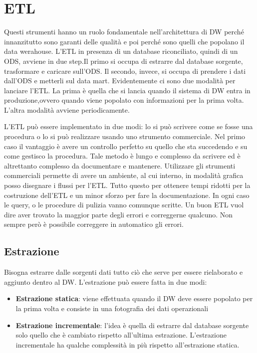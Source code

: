 \section{ETL}

Questi strumenti hanno un ruolo fondamentale nell’architettura di DW perché innanzitutto sono garanti delle qualità e poi perché sono quelli che popolano il data werahouse. L’ETL in presenza di un database riconciliato, quindi di un ODS, avviene in due step.Il primo si occupa di estrarre dal database sorgente, trasformare e caricare sull’ODS. Il secondo, invece, si occupa di prendere i dati dall’ODS e metterli sul data mart. Evidentemente ci sono due modalità per lanciare l’ETL. La prima è quella che si lancia quando il sistema di DW entra in produzione,ovvero quando viene popolato con informazioni per la prima volta. L’altra modalità avviene periodicamente. 

L’ETL può essere implementato in due modi: lo si può scrivere come se fosse una procedura o lo si può realizzare usando uno strumento commerciale. Nel primo caso il vantaggio è avere un controllo perfetto su quello che sta succedendo e su come gestisco la procedura. Tale metodo è lungo e complesso da scrivere ed è altrettanto complesso da documentare e mantenere. Utilizzare gli strumenti commerciali permette di avere un ambiente, al cui interno, in modalità grafica posso disegnare i flussi per l’ETL. Tutto questo per ottenere tempi ridotti per la costruzione dell’ETL e un minor sforzo per fare la documentazione. In ogni caso le query, o le procedure di pulizia vanno comunque scritte. Un buon ETL vuol dire aver trovato la maggior parte degli errori e correggerne qualcuno. Non sempre però è possibile correggere in automatico gli errori. 
\subsection{Estrazione}
Bisogna estrarre dalle sorgenti dati tutto ciò che serve per essere rielaborato e aggiunto dentro al DW. L’estrazione può essere fatta in due modi:
\begin{itemize}
	\item 
	\textbf{Estrazione statica}: viene effettuata quando il DW deve essere popolato per la prima volta e consiste in una fotografia dei dati operazionali
	\item 
	\textbf{Estrazione incrementale}: l’idea è quella di estrarre dal database sorgente solo quello che è cambiato rispetto all’ultima estrazione. L’estrazione incrementale ha qualche complessità in più rispetto all’estrazione statica. 
\end{itemize}
